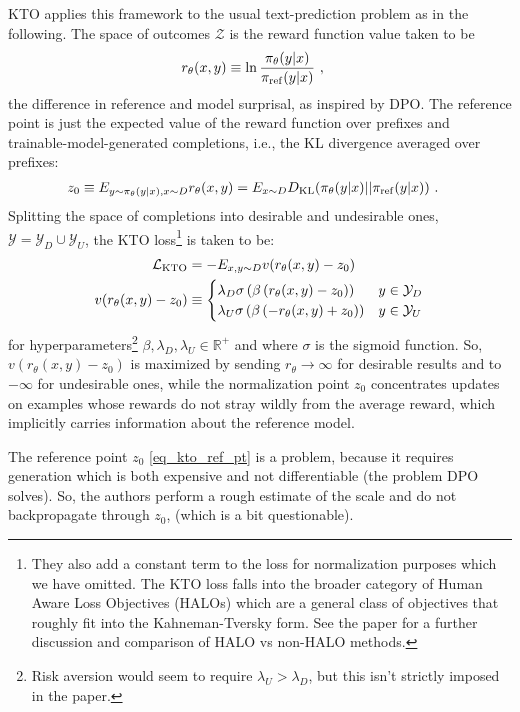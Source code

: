 KTO applies this framework to the usual text-prediction problem as in the following. The space of
outcomes $ \mathcal{Z} $ is the reward function value taken to be
\begin{align}
    r _{ \theta  }(x, y)&\equiv \ln \frac{ \pi _{ \theta  }(y|x) }{ \pi _{ {\rm ref}}(y|x) } \ , \label{eq_kto_reward}
\end{align}
the difference in reference and model surprisal, as inspired by DPO. The reference point is just the
expected value of the reward function over prefixes and trainable-model-generated completions, i.e.,
the KL divergence averaged over prefixes:
\begin{align}
   z _{ 0 }  & \equiv  E _{ y \sim \pi _{ \theta  }(y|x)  ,   x \sim D  }r _{ \theta  }(x, y) =E _{ x \sim D  } D _{ {\rm KL} }(\pi _{ \theta  }(y|x)|| \pi _{ {\rm ref} }(y|x)) \ . \label{eq_kto_ref_pt}
\end{align}
Splitting the space of completions into desirable and undesirable ones,  $ \mathcal{Y}=
\mathcal{Y}_{ D }\cup \mathcal{Y}_{ U } $, the KTO loss\footnote{They also add a constant term to
    the loss for normalization purposes which we have omitted. The KTO loss falls into the broader
    category of Human Aware Loss Objectives (HALOs) which are a general class of objectives that
    roughly fit into the Kahneman-Tversky form. See the paper for a further discussion and
    comparison of HALO vs non-HALO methods.
} is taken to be:
\begin{align}
    \mathcal{L}_{ {\rm KTO} } &= - E _{ x, y \sim D }v(r _{ \theta  }(x, y) - z _{ 0 })\nonumber\\
    v(r _{ \theta  }(x, y)-z _{ 0 })&\equiv  \begin{cases}
        \lambda _{ D }\sigma \left ( \beta \left ( r _{ \theta  }(x, y) - z _{ 0 } \right ) \right ) & y \in \mathcal{Y}_{ D }\nonumber\\
        \lambda _{ U }\sigma \left ( \beta \left ( -r _{ \theta  }(x, y) + z _{ 0 } \right ) \right ) & y \in \mathcal{Y}_{ U } \label{eq_kto_loss}
    \end{cases}
\end{align}
for hyperparameters\footnote{Risk aversion would seem to require $ \lambda _{ U }> \lambda _{ D }$,
but this isn't strictly imposed in the paper.} $ \beta , \lambda _{ D }, \lambda _{ U } \in
\mathbb{R} ^{ + } $ and where $ \sigma  $ is the sigmoid function. So,  $ v(r _{ \theta  }(x,
y)-z _{ 0 }) $ is maximized by sending $ r _{ \theta   } \longrightarrow  \infty $ for desirable
results and to $ -\infty $ for undesirable ones, while the normalization point $ z _{ 0 } $
concentrates updates on examples whose rewards do not stray wildly from the average reward, which
implicitly carries information about the reference model.

The reference point $ z _{ 0 } $ \eqref{eq_kto_ref_pt} is a problem, because it requires generation
which is both expensive and not differentiable (the problem DPO solves). So, the authors perform a
rough estimate of the scale and do not backpropagate through $ z _{ 0 } $, (which is a bit
questionable).

